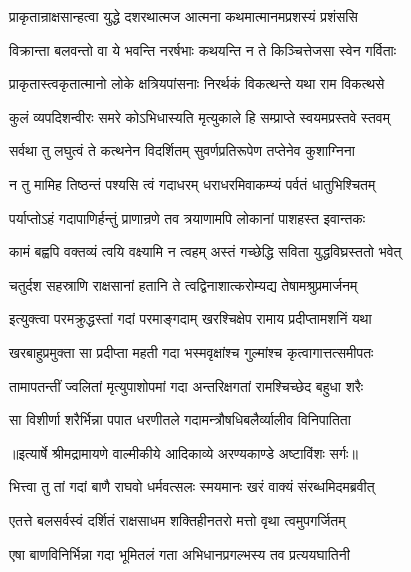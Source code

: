 \twolineshloka
{प्राकृतान्राक्षसान्हत्वा युद्धे दशरथात्मज}
{आत्मना कथमात्मानमप्रशस्यं प्रशंससि} %

\twolineshloka
{विक्रान्ता बलवन्तो वा ये भवन्ति नरर्षभाः}
{कथयन्ति न ते किञ्चित्तेजसा स्वेन गर्विताः} %

\twolineshloka
{प्राकृतास्त्वकृतात्मानो लोके क्षत्रियपांसनाः}
{निरर्थकं विकत्थन्ते यथा राम विकत्थसे} %

\twolineshloka
{कुलं व्यपदिशन्वीरः समरे कोऽभिधास्यति}
{मृत्युकाले हि सम्प्राप्ते स्वयमप्रस्तवे स्तवम्} %

\twolineshloka
{सर्वथा तु लघुत्वं ते कत्थनेन विदर्शितम्}
{सुवर्णप्रतिरूपेण तप्तेनेव कुशाग्निना} %

\twolineshloka
{न तु मामिह तिष्ठन्तं पश्यसि त्वं गदाधरम्}
{धराधरमिवाकम्प्यं पर्वतं धातुभिश्चितम्} %

\twolineshloka
{पर्याप्तोऽहं गदापाणिर्हन्तुं प्राणान्रणे तव}
{त्रयाणामपि लोकानां पाशहस्त इवान्तकः} %

\twolineshloka
{कामं बह्वपि वक्तव्यं त्वयि वक्ष्यामि न त्वहम्}
{अस्तं गच्छेद्धि सविता युद्धविघ्रस्ततो भवेत्} %

\twolineshloka
{चतुर्दश सहस्राणि राक्षसानां हतानि ते}
{त्वद्विनाशात्करोम्यद्य तेषामश्रुप्रमार्जनम्} %

\twolineshloka
{इत्युक्त्वा परमक्रुद्धस्तां गदां परमाङ्गदाम्}
{खरश्चिक्षेप रामाय प्रदीप्तामशनिं यथा} %

\twolineshloka
{खरबाहुप्रमुक्ता सा प्रदीप्ता महती गदा}
{भस्मवृक्षांश्च गुल्मांश्च कृत्वागात्तत्समीपतः} %

\twolineshloka
{तामापतन्तीं ज्वलितां मृत्युपाशोपमां गदा}
{अन्तरिक्षगतां रामश्चिच्छेद बहुधा शरैः} %

\twolineshloka
{सा विशीर्णा शरैर्भिन्ना पपात धरणीतले}
{गदामन्त्रौषधिबलैर्व्यालीव विनिपातिता} %


{॥इत्यार्षे श्रीमद्रामायणे वाल्मीकीये आदिकाव्ये अरण्यकाण्डे अष्टाविंशः सर्गः॥}


\twolineshloka
{भित्त्वा तु तां गदां बाणै राघवो धर्मवत्सलः}
{स्मयमानः खरं वाक्यं संरब्धमिदमब्रवीत्} %

\twolineshloka
{एतत्ते बलसर्वस्वं दर्शितं राक्षसाधम}
{शक्तिहीनतरो मत्तो वृथा त्वमुपगर्जितम्} %

\twolineshloka
{एषा बाणविनिर्भिन्ना गदा भूमितलं गता}
{अभिधानप्रगल्भस्य तव प्रत्ययघातिनी} %

